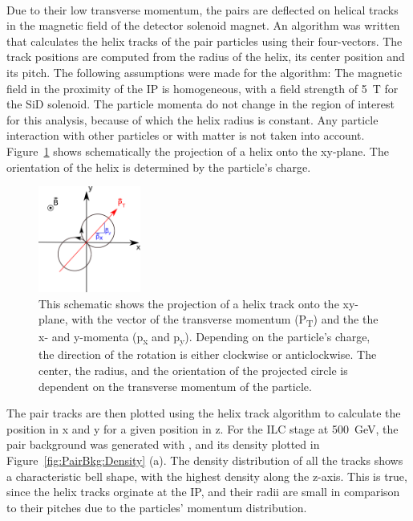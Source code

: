\\Due to their low transverse momentum, the pairs are deflected on helical tracks in the magnetic field of the detector solenoid magnet.
An algorithm was written that calculates the helix tracks of the pair particles using their four-vectors.
The track positions are computed from the radius of the helix, its center position and its pitch. The following assumptions were made for the algorithm:
The magnetic field in the proximity of the IP is homogeneous, with a field strength of \SI{5}{\tesla} for the SiD solenoid.
The particle momenta do not change in the region of interest for this analysis, because of which the helix radius is constant.
Any particle interaction with other particles or with matter is not taken into account.
\\Figure~\ref{fig:helix_circle} shows schematically the projection of a helix onto the xy-plane.
The orientation of the helix is determined by the particle's charge.
\begin{figure}
    \centering
    \includegraphics[width=0.3\textwidth]{Figures/Pairs/Helix_explanation.png}
    \caption[Schematic projection of the helix on the xy-plane]{
    This schematic shows the projection of a helix track onto the xy-plane, with the vector of the transverse momentum (P\textsubscript{T}) and the the x- and y-momenta (p\textsubscript{x} and p\textsubscript{y}).
    Depending on the particle's charge, the direction of the rotation is either clockwise or anticlockwise.
    The center, the radius, and the orientation of the projected circle is dependent on the transverse momentum of the particle.
    }
    \label{fig:helix_circle}
\end{figure}
The pair tracks are then plotted using the helix track algorithm to calculate the position in x and y for a given position in z.
For the ILC stage at \SI{500}{\GeV}, the pair background was generated with \guineapig, and its density plotted in Figure~\ref{fig:PairBkg:Density} (a).
The density distribution of all the tracks shows a characteristic bell shape, with the highest density along the z-axis.
This is true, since the helix tracks orginate at the IP, and their radii are small in comparison to their pitches due to the particles' momentum distribution.
